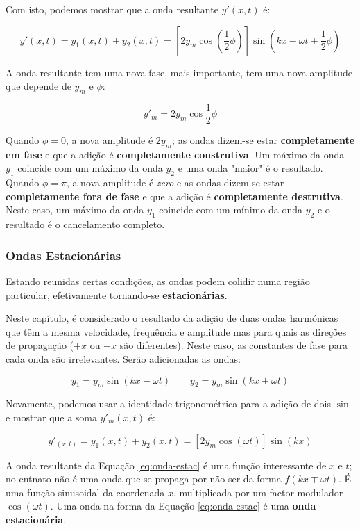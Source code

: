 Com isto, podemos mostrar que a onda resultante $y'(x,t)$ é:

\begin{equation}
    y'(x,t)=y_1(x,t)+y_2(x,t)=[2y_m\cos(\frac{1}{2}\phi)]\sin(kx-\omega t + \frac{1}{2}\phi)
\end{equation}

A onda resultante tem uma nova fase, mais importante, tem uma nova amplitude que depende de $y_m$ e $\phi$:

\begin{equation}
    y'_m=2y_m\cos\frac{1}{2}\phi
\end{equation}

Quando $\phi=0$, a nova amplitude é $2y_m$; as ondas dizem-se estar \textbf{completamente em fase} e que a adição é \textbf{completamente construtiva}. Um máximo da onda $y_1$ coincide com um máximo da onda $y_2$ e uma onda "maior" é o resultado.
Quando $\phi=\pi$, a nova amplitude é \emph{zero} e as ondas dizem-se estar \textbf{completamente fora de fase} e que a adição é \textbf{completamente destrutiva}. Neste caso, um máximo da onda $y_1$ coincide com um mínimo da onda $y_2$ e o resultado é o cancelamento completo.

\subsubsection{Ondas Estacionárias}
Estando reunidas certas condições, as ondas podem colidir numa região particular, efetivamente tornando-se \textbf{estacionárias}.

Neste capítulo, é considerado o resultado da adição de duas ondas harmónicas que têm a mesma velocidade, frequência e amplitude mas para quais as direções de propagação ($+x$ ou $-x$ são diferentes). Neste caso, as constantes de fase para cada onda são irrelevantes. Serão adicionadas as ondas:

\begin{equation}
    y_1=y_m\sin(kx-\omega t) \qquad y_2=y_m\sin(kx+\omega t)
\end{equation}

Novamente, podemos usar a identidade trigonométrica para a adição de dois $\sin$ e mostrar que a soma $y'_m(x,t)$ é:

\begin{equation}\label{eq:onda-estac}
    y'_(x,t)=y_1(x,t)+y_2(x,t)=[2y_m\cos(\omega t)]\sin(kx)
\end{equation}

A onda resultante da Equação \ref{eq:onda-estac} é uma função interessante de $x$ e $t$; no entnato não é uma onda que se propaga por não ser da forma $f(kx\mp\omega t)$. É uma função sinusoidal da coordenada $x$, multiplicada por um factor modulador $\cos(\omega t)$. Uma onda na forma da Equação \ref{eq:onda-estac} é uma \textbf{onda estacionária}.

